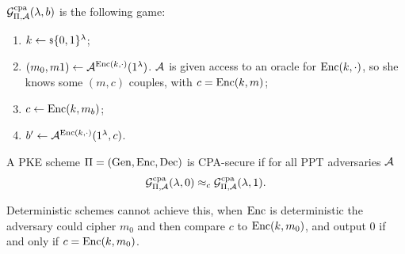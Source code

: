 $\mathcal{G}^{\scriptstyle \text{cpa}}_{\Pi,\mathcal{A}}(\lambda, b)$ is the following game:
\begin{enumerate}
	\item $k \leftarrow {\scriptstyle \$} {\{0,1\}^{\lambda}}$;
	\item $(m_0, m1) \leftarrow \mathcal{A}^{\mathrm{Enc}(k, \cdot)} (1^{\lambda})$.
		$\mathcal{A}$ is given access to an oracle for $\mathrm{Enc}(k, \cdot)$, so she knows some $(m,c)$ couples, with $c = \mathrm{Enc}(k, m)$;
	\item $c \leftarrow \mathrm{Enc}(k, m_b)$;
	\item $b' \leftarrow \mathcal{A}^{\mathrm{Enc}(k, \cdot)}(1^{\lambda}, c)$.
\end{enumerate}

\begin{definition}
	A \ac{PKE} scheme $\Pi = \left( \mathrm{Gen} , \allowbreak \mathrm{Enc} , \allowbreak \mathrm{Dec} \right)$ is \ac{CPA}-secure if for all \ac{PPT} adversaries $\mathcal{A}$
	\begin{equation*}
		\mathcal{G}^{\scriptstyle \text{cpa}}_{\Pi,\mathcal{A}}(\lambda, 0) \approx_c \mathcal{G}^{\scriptstyle \text{cpa}}_{\Pi,\mathcal{A}}(\lambda, 1).
	\end{equation*}
\end{definition}

Deterministic schemes cannot achieve this, \ie when $\mathrm{Enc}$ is deterministic the adversary could cipher $m_0$ and then compare $c$ to $\mathrm{Enc}(k, m_0)$, and output $0$ if and only if $c = \mathrm{Enc}(k, m_0)$.
